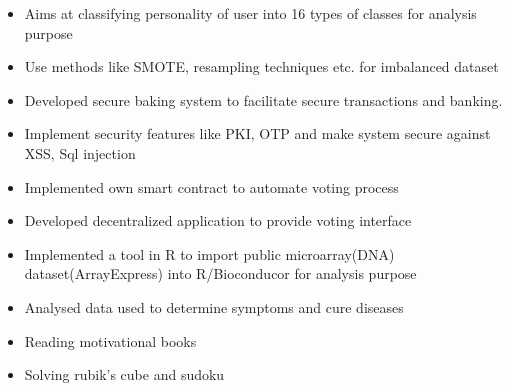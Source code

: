 \begin{itemize}
\item Aims at classifying personality of user into 16 types of classes for analysis purpose
\item Use methods like SMOTE, resampling techniques etc. for imbalanced dataset
\end{itemize}
\smallskip

\begin{itemize}
\item Developed secure baking system to facilitate secure transactions and banking.
\item Implement security features like PKI, OTP and make system secure against XSS, Sql injection
\end{itemize}
\smallskip

\begin{itemize}
\item Implemented own smart contract to automate voting process
\item Developed decentralized application to provide voting interface
\end{itemize}
\smallskip

\begin{itemize}
\item Implemented a tool in R to import public microarray(DNA) dataset(ArrayExpress) into R/Bioconducor for analysis purpose
\item Analysed data used to determine symptoms and cure diseases
\end{itemize}

\smallskip
\begin{itemize}
    \item Reading motivational books
    \item Solving rubik's cube and sudoku
\end{itemize}
